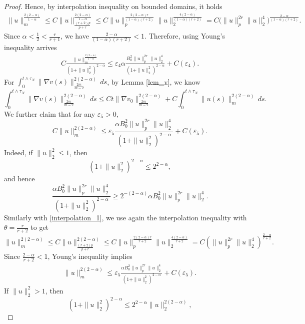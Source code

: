 \documentclass[10pt,a4paper]{amsart}
\begin{document}
\begin{proof}
	Hence, by interpolation inequality on bounded domains, it holds 
	\begin{align}\label{interpolation_1}
	    \|u\|_m^{\frac{2(2-\alpha)}{1-\alpha}}\le C\|u\|_{\frac{(r+2)p}{p+r}}^{\frac{2(2-\alpha)}{1-\alpha}}
	\le
	C\|u\|_p^{\frac{2(2-\alpha)r}{(1-\alpha)(r+2)}}
	\|u\|_2^{\frac{4(2-\alpha)}{(1-\alpha)(r+2)}}
	=
	C\big(\|u\|_p^{2r}\|u\|_2^4\big)^{\frac{2-\alpha}{(1-\alpha)(r+2)}}.
	\end{align}
	Since $\alpha<\frac{1}{2}<\frac{r}{r+1}$, we have $\frac{2-\alpha}{(1-\alpha)(r+2)}<1.$
	Therefore, using Young's inequality arrives
	\begin{align}
		\label{u_m_a}
		C\frac{\|u\|_m^{\frac{2(2-\alpha)}{1-\alpha}}}{(1+\|u\|_2^2)^{2-\alpha}}
		\le
		\varepsilon_4 \alpha\frac{{B_0^2}\|u\|_p^{2r}\|u\|_2^4}{(1+\|u\|_2^2)^{2-\alpha}}
		+C(\varepsilon_4).
	\end{align}
	For $\int_0^{t\wedge{\tau_N}}\|\nabla v(s)\|_{\frac{2m}{m-2}}^{2(2-\alpha)}\,ds$,  by Lemma \ref{lem_v}, we know 
	\begin{equation}
		\int_0^{t\wedge{\tau_N}}\|\nabla v(s)\|_{\frac{2m}{m-2}}^{2(2-\alpha)}\,ds
		\le
		Ct\|\nabla v_0\|_{\frac{2m}{m-2}}^{2(2-\alpha)}+C\int_0^{t\wedge{\tau_N}}\|u(s)\|_m^{2(2-\alpha)}\,ds.
	\end{equation}
	We further claim that for any $\varepsilon_5>0$,
	\begin{equation}
		\label{ine_u,m}
C\|u\|_m^{2(2-\alpha)}
\le\varepsilon_5
		\frac{\alpha{B_0^2}\|u\|_p^{2r}\|u\|_2^4}{(1+\|u\|_2^2)^{2-\alpha}}
		+
		C(\varepsilon_5).
	\end{equation}
    Indeed, if  $\|u\|_2^2\le 1$,
	then
	\[
	(1+\|u\|_2^2)^{2-\alpha}\le 2^{2-\alpha},
	\]
	and hence
	\[
	\frac{\alpha{B_0^2}\|u\|_p^{2r}\|u\|_2^4}{(1+\|u\|_2^2)^{2-\alpha}}
	\ge
	2^{-(2-\alpha)}\alpha{B_0^2}\|u\|_p^{2r}\|u\|_2^4.
	\]
	Similarly with \eqref{interpolation_1}, we use again the interpolation inequality with $\theta=\frac{r}{r+2}$ to get
	\[
	\|u\|_m^{2(2-\alpha)}
	\le C\|u\|_{\frac{(r+2)p}{p+r}}^{2(2-\alpha)}\le
	C\|u\|_p^{\frac{2(2-\alpha)r}{r+2}}
	\|u\|_2^{\frac{4(2-\alpha)}{r+2}}
	=
	C(\|u\|_p^{2r}\|u\|_2^4)^{\frac{2-\alpha}{r+2}}.
	\]
	Since $\frac{2-\alpha}{r+2}<1$, Young's inequality implies
	\begin{align}
	    \|u\|_m^{2(2-\alpha)}
	\le
	\varepsilon_5\frac{\alpha{B_0^2}\|u\|_p^{2r}\|u\|_2^4}{(1+\|u\|_2^2)^{2-\alpha}}
	+
	C(\varepsilon_5).
	\end{align}
	 If $\|u\|_2^2>1$, then
	\[
	(1+\|u\|_2^2)^{2-\alpha}\le 2^{2-\alpha}\|u\|_2^{2(2-\alpha)},
\]
\end{proof}
\end{document}
